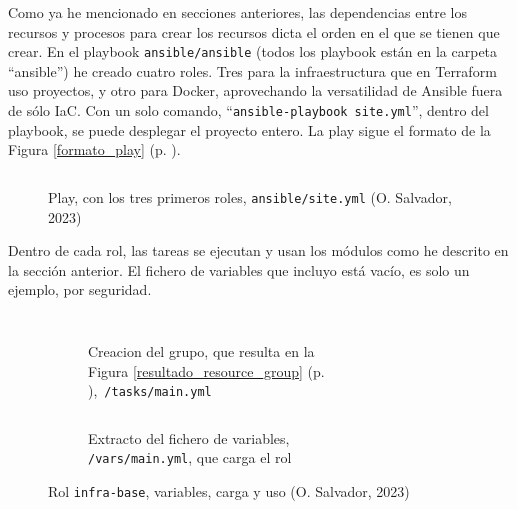 \documentclass[11pt]{article}
\begin{document}
\begin{flushleft}
    Como ya he mencionado en secciones anteriores, las dependencias entre los recursos y procesos para crear los recursos dicta el orden en el que se tienen que crear. En el playbook \texttt{ansible/ansible} (todos los playbook están en la carpeta ``ansible'') he creado cuatro roles. Tres para la infraestructura que en Terraform uso proyectos, y otro para Docker, aprovechando la versatilidad de Ansible fuera de sólo IaC. Con un solo comando, ``\texttt{ansible-playbook site.yml}'', dentro del playbook, se puede desplegar el proyecto entero. La play sigue el formato de la Figura \ref{formato_play} (p. \pageref{formato_play}).
    \linebreak

        \begin{figure}[htb]
			\centering
			\begin{subfigure}{0.65\textwidth}
                \inputminted[fontsize=\scriptsize, firstline=1, lastline=15, linenos, frame=single, breaklines]{yaml}{../../ansible/ansible/site.yml}
			\end{subfigure}
            \caption{Play, con los tres primeros roles, \texttt{ansible/site.yml} (O. Salvador, 2023)}
		\end{figure} 

    
    Dentro de cada rol, las tareas se ejecutan y usan los módulos como he descrito en la sección anterior. El fichero de variables que incluyo está vacío, es solo un ejemplo, por seguridad.
    \linebreak

        \begin{figure}[htb]
			\centering
			\begin{subfigure}{0.4\textwidth}
                \inputminted[fontsize=\scriptsize, firstline=1, lastline=2, linenos, frame=single, breaklines]{yaml}{../../ansible/ansible/roles/infra-base/main.yml}
                \inputminted[fontsize=\scriptsize, firstline=14, lastline=22, linenos, frame=single, breaklines]{yaml}{../../ansible/ansible/roles/infra-base/main.yml}
                \caption{Creacion del grupo, que resulta en la\\Figura \ref{resultado_resource_group} (p. \pageref{resultado_resource_group}),\ \texttt{/tasks/main.yml}}
			\end{subfigure}
            \hspace{2cm}
            \begin{subfigure}{0.4\textwidth}
                \inputminted[fontsize=\scriptsize, firstline=1, lastline=12, linenos, frame=single, breaklines]{yaml}{../../ansible/ansible/roles/infra-base/examplemain.yml}
                \vspace{.2cm}
                \caption{Extracto del fichero de variables, \\\texttt{/vars/main.yml}, que carga el rol}
			\end{subfigure}
            \caption{Rol \texttt{infra-base}, variables, carga y uso (O. Salvador, 2023)}
		\end{figure} 


\end{flushleft}
\end{document}
